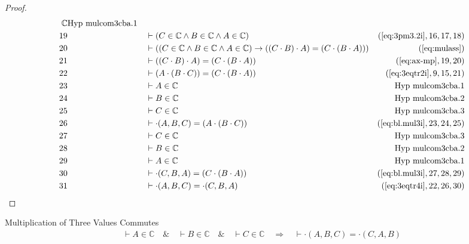 \begin{proof}
\begin{align}
\mathbb{C}&\text{Hyp~mulcom3cba.1}\notag%
  \\ 19 &&  & \vdash ( C \in \mathbb{C} \wedge B \in \mathbb{C} \wedge A \in
     \mathbb{C} )&(\mbox{\ref{eq:3pm3.2i}},16,17,18)\notag
  \\ 20 &&  & \vdash ( ( C \in \mathbb{C} \wedge B \in \mathbb{C} \wedge A \in
     \mathbb{C} ) \rightarrow ( ( C \cdot B ) \cdot A ) =
     ( C \cdot ( B \cdot A ) )
     )&(\mbox{\ref{eq:mulass}})\notag
  \\ 21 &&  & \vdash ( ( C \cdot B ) \cdot A ) = ( C \cdot ( B \cdot A )
     )&(\mbox{\ref{eq:ax-mp}},19,20)\notag
  \\ 22 &&  & \vdash ( A \cdot ( B \cdot C ) ) = ( C \cdot ( B \cdot A )
     )&(\mbox{\ref{eq:3eqtr2i}},9,15,21)\notag
  \\ 23 &&  & \vdash A \in
\mathbb{C}&\text{Hyp~mulcom3cba.1}\notag%
  \\ 24 &&  & \vdash B \in
\mathbb{C}&\text{Hyp~mulcom3cba.2}\notag%
  \\ 25 &&  & \vdash C \in
\mathbb{C}&\text{Hyp~mulcom3cba.3}\notag%
  \\ 26 &&  & \vdash \cdot( A , B , C ) = ( A \cdot ( B \cdot C )
     )&(\mbox{\ref{eq:bl.mul3i}},23,24,25)\notag
  \\ 27 &&  & \vdash C \in
\mathbb{C}&\text{Hyp~mulcom3cba.3}\notag%
  \\ 28 &&  & \vdash B \in
\mathbb{C}&\text{Hyp~mulcom3cba.2}\notag%
  \\ 29 &&  & \vdash A \in
\mathbb{C}&\text{Hyp~mulcom3cba.1}\notag%
  \\ 30 &&  & \vdash \cdot( C , B , A ) = ( C \cdot ( B \cdot A )
     )&(\mbox{\ref{eq:bl.mul3i}},27,28,29)\notag
  \\ 31 &&  & \vdash \cdot( A , B , C ) = \cdot( C , B , A
     )&(\mbox{\ref{eq:3eqtr4i}},22,26,30)\notag
\end{align}
\end{proof}

\begin{lemma} {Multiplication of Three Values
Commutes}
\begin{align}
\vdash A \in \mathbb{C}\quad\&\quad \vdash B \in \mathbb{C}\quad\&\quad \vdash
    C \in \mathbb{C}\quad\Rightarrow\quad \vdash \cdot( A , B , C ) = \cdot( C
    , A , B )\label{eq:bl.mulcom3cab}\tag{bl.mulcom3cab}
\end{align}
\end{lemma}


